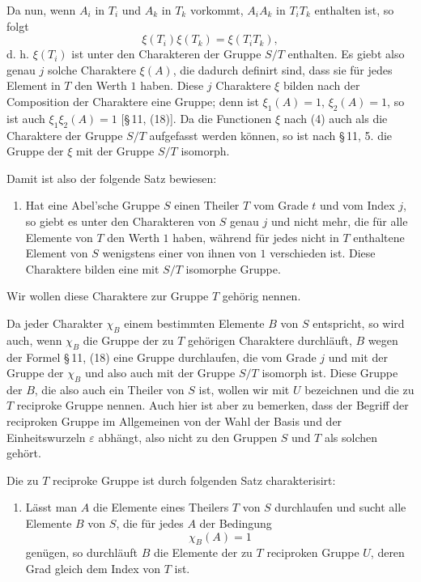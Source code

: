 \documentclass[11pt]{article}
\begin{document}
Da nun, wenn $A_i$ in $T_i$ und $A_k$ in $T_k$ vorkommt, $A_iA_k$ in $T_iT_k$ enthalten ist, so folgt
\begin{equation}
\xi(T_i)\xi(T_k)=\xi(T_iT_k),
\tag{6}
\end{equation}
d. h. $\xi(T_i)$ ist unter den Charakteren der Gruppe $S/T$ enthalten. Es giebt also genau $j$ solche Charaktere $\xi(A)$, die dadurch definirt sind, dass sie für jedes Element in $T$ den Werth $1$ haben. Diese $j$ Charaktere $\xi$ bilden nach der Composition der Charaktere eine Gruppe; denn ist $\xi_1(A)=1$, $\xi_2(A)=1$, so ist auch $\xi_1\xi_2(A)=1$ [\S\,11, (18)]. Da die Functionen $\xi$ nach (4) auch als die Charaktere der Gruppe $S/T$ aufgefasst werden können, so ist nach \S\,11, 5. die Gruppe der $\xi$ mit der Gruppe $S/T$ isomorph.

Damit ist also der folgende Satz bewiesen:

\begin{enumerate}[label=\arabic*.,start=7]
\item Hat eine Abel'sche Gruppe $S$ einen Theiler $T$ vom Grade $t$ und vom Index $j$, so giebt es unter den Charakteren von $S$ genau $j$ und nicht mehr, die für alle Elemente von $T$ den Werth $1$ haben, während für jedes nicht in $T$ enthaltene Element von $S$ wenigstens einer von ihnen von $1$ verschieden ist. Diese Charaktere bilden eine mit $S/T$ isomorphe Gruppe.
\end{enumerate}

Wir wollen diese Charaktere zur Gruppe $T$ gehörig nennen.

Da jeder Charakter $\chi_B$ einem bestimmten Elemente $B$ von $S$ entspricht, so wird auch, wenn $\chi_B$ die Gruppe der zu $T$ gehörigen Charaktere durchläuft, $B$ wegen der Formel \S\,11, (18) eine Gruppe durchlaufen, die vom Grade $j$ und mit der Gruppe der $\chi_B$ und also auch mit der Gruppe $S/T$ isomorph ist. Diese Gruppe der $B$, die also auch ein Theiler von $S$ ist, wollen wir mit $U$ bezeichnen und die zu $T$ reciproke Gruppe nennen. Auch hier ist aber zu bemerken, dass der Begriff der reciproken Gruppe im Allgemeinen von der Wahl der Basis und der Einheitswurzeln $\varepsilon$ abhängt, also nicht zu den Gruppen $S$ und $T$ als solchen gehört.

Die zu $T$ reciproke Gruppe ist durch folgenden Satz charakterisirt:

\begin{enumerate}[resume,label=\arabic*.]
\item Lässt man $A$ die Elemente eines Theilers $T$ von $S$ durchlaufen und sucht alle Elemente $B$ von $S$, die für jedes $A$ der Bedingung
\begin{equation}
\chi_B(A)=1
\tag{7}
\end{equation}
genügen, so durchläuft $B$ die Elemente der zu $T$ reciproken Gruppe $U$, deren Grad gleich dem Index von $T$ ist.
\end{enumerate}
\end{document}

